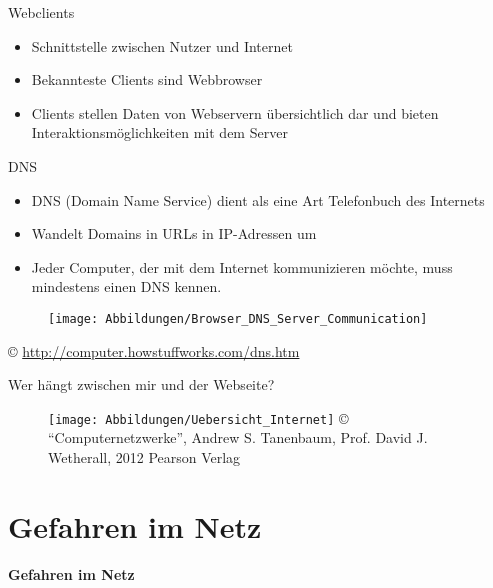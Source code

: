 \documentclass[hyperref={colorlinks,linkcolor=white}, utf8]{beamer}
\begin{document}
	\begin{frame}{Webclients}
		\begin{itemize}
			\item Schnittstelle zwischen Nutzer und Internet
			\item Bekannteste Clients sind Webbrowser
			\item Clients stellen Daten von Webservern übersichtlich dar und bieten Interaktionsmöglichkeiten mit dem Server
		\end{itemize}
	\end{frame}
	
	\begin{frame}{DNS}
		\begin{itemize}
			\item DNS (Domain Name Service) dient als eine Art Telefonbuch des Internets
			\item Wandelt Domains in URLs in IP-Adressen um
			\item Jeder Computer, der mit dem Internet kommunizieren möchte, muss mindestens einen DNS kennen.
		\end{itemize}
	
		\begin{figure}[H]
			\texttt{[image: Abbildungen/Browser\_DNS\_Server\_Communication]}
		\end{figure}		
		\centering \tiny \copyright\; \url{http://computer.howstuffworks.com/dns.htm}		
	\end{frame}
	
	\begin{frame}{Wer hängt zwischen mir und der Webseite?}
		\begin{figure}[H]
			\texttt{[image: Abbildungen/Uebersicht\_Internet]}
			\label{fig:Übersicht des Internets}
			\tiny \copyright \; \enquote{Computernetzwerke}, Andrew S. Tanenbaum, Prof. David J. Wetherall, 2012 Pearson Verlag
		\end{figure}
	\end{frame}
	
	\section{Gefahren im Netz}
	\begin{frame}
		\centering \huge \textbf{Gefahren im Netz}
	\end{frame}
	
\end{document}

